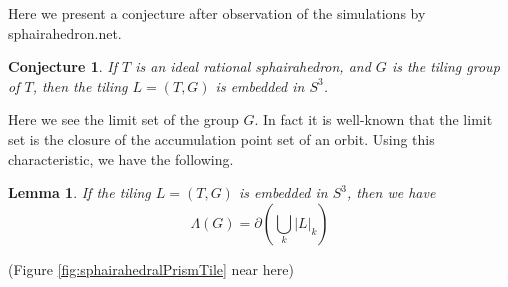 \documentclass[suppldata, dvipdfmx]{interact}
\theoremstyle{plain}%
\newtheorem{lemma}[theorem]{Lemma}
\newtheorem{conjecture}[theorem]{Conjecture}
\theoremstyle{definition}
\theoremstyle{remark}
\theoremstyle{problemstyle}
\begin{document}
Here we present a conjecture after observation of the simulations by sphairahedron.net\cite{sphairahedron_net}.

\begin{conjecture}
If $T$ is an ideal rational sphairahedron, and $G$ is the tiling group of $T$, then the tiling $L=(T,G)$ is embedded in $S^3$.
\end{conjecture}

Here we see the limit set of the group $G$.  In fact it is well-known that the limit set is the closure of the accumulation point set of an orbit.  Using this characteristic, we have the following.

\begin{lemma}
If the tiling $L=(T,G)$ is embedded in $S^3$, then we have
\[
\Lambda(G) =\partial\left(\bigcup_k |L|_k\right)
\]
\end{lemma}

\noindent(Figure \ref{fig:sphairahedralPrismTile}
 near here)
\end{document}
